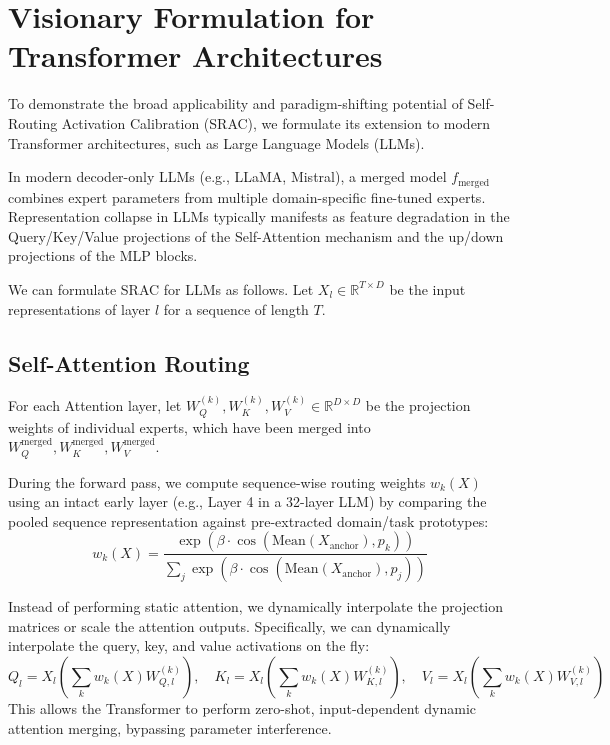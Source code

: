 \documentclass{article}
\theoremstyle{plain}
\theoremstyle{definition}
\theoremstyle{remark}
\begin{document}
\section{Visionary Formulation for Transformer Architectures}
\label{sec:appendix_transformers}

To demonstrate the broad applicability and paradigm-shifting potential of Self-Routing Activation Calibration (SRAC), we formulate its extension to modern Transformer architectures, such as Large Language Models (LLMs).

In modern decoder-only LLMs (e.g., LLaMA, Mistral), a merged model $f_{\text{merged}}$ combines expert parameters from multiple domain-specific fine-tuned experts. Representation collapse in LLMs typically manifests as feature degradation in the Query/Key/Value projections of the Self-Attention mechanism and the up/down projections of the MLP blocks.

We can formulate SRAC for LLMs as follows. Let $X_l \in \mathbb{R}^{T \times D}$ be the input representations of layer $l$ for a sequence of length $T$.

\subsection{Self-Attention Routing}
For each Attention layer, let $W_Q^{(k)}, W_K^{(k)}, W_V^{(k)} \in \mathbb{R}^{D \times D}$ be the projection weights of individual experts, which have been merged into $W_Q^{\text{merged}}, W_K^{\text{merged}}, W_V^{\text{merged}}$.

During the forward pass, we compute sequence-wise routing weights $w_k(X)$ using an intact early layer (e.g., Layer 4 in a 32-layer LLM) by comparing the pooled sequence representation against pre-extracted domain/task prototypes:
\begin{equation}
  w_k(X) = \frac{\exp(\beta \cdot \cos(\text{Mean}(X_{\text{anchor}}), p_k))}{\sum_{j} \exp(\beta \cdot \cos(\text{Mean}(X_{\text{anchor}}), p_j))}
\end{equation}

Instead of performing static attention, we dynamically interpolate the projection matrices or scale the attention outputs. Specifically, we can dynamically interpolate the query, key, and value activations on the fly:
\begin{equation}
  Q_l = X_l \left( \sum_{k} w_k(X) W_{Q,l}^{(k)} \right), \quad K_l = X_l \left( \sum_{k} w_k(X) W_{K,l}^{(k)} \right), \quad V_l = X_l \left( \sum_{k} w_k(X) W_{V,l}^{(k)} \right)
\end{equation}
This allows the Transformer to perform zero-shot, input-dependent dynamic attention merging, bypassing parameter interference.
\end{document}
